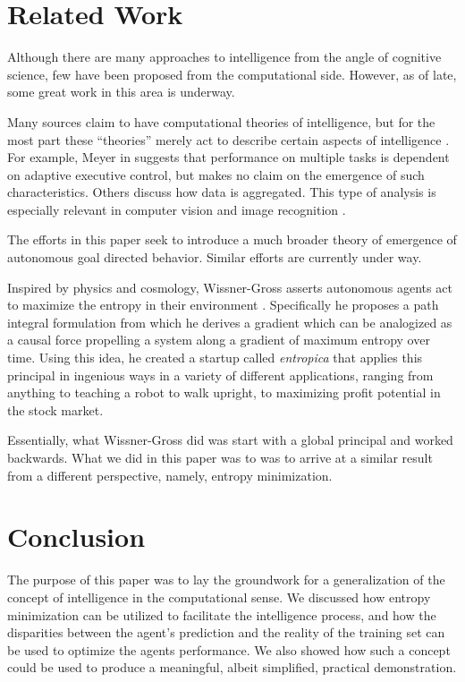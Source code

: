 \documentclass[english]{article}
\begin{document}
\section{Related Work\label{sec:Related-Work}}

Although there are many approaches to intelligence from the angle
of cognitive science, few have been proposed from the computational
side. However, as of late, some great work in this area is underway.

Many sources claim to have computational theories of intelligence,
but for the most part these ``theories'' merely act to describe
certain aspects of intelligence \cite{alb}. For example, Meyer in
\cite{meyer} suggests that performance on multiple tasks is dependent
on adaptive executive control, but makes no claim on the emergence
of such characteristics. Others discuss how data is aggregated. This
type of analysis is especially relevant in computer vision and image
recognition \cite{marr}.

The efforts in this paper seek to introduce a much broader theory
of emergence of autonomous goal directed behavior. Similar efforts
are currently under way.

Inspired by physics and cosmology, Wissner-Gross asserts autonomous
agents act to maximize the entropy in their environment \cite{wis}.
Specifically he proposes a path integral formulation from which he
derives a gradient which can be analogized as a causal force propelling
a system along a gradient of maximum entropy over time. Using this
idea, he created a startup called \emph{entropica} that applies this
principal in ingenious ways in a variety of different applications,
ranging from anything to teaching a robot to walk upright, to maximizing
profit potential in the stock market.

Essentially, what Wissner-Gross did was start with a global principal
and worked backwards. What we did in this paper was to was to arrive
at a similar result from a different perspective, namely, entropy
minimization.


\section{Conclusion\label{sec:Conclusion}}

The purpose of this paper was to lay the groundwork for a generalization
of the concept of intelligence in the computational sense. We discussed
how entropy minimization can be utilized to facilitate the intelligence
process, and how the disparities between the agent's prediction and
the reality of the training set can be used to optimize the agents
performance. We also showed how such a concept could be used to produce
a meaningful, albeit simplified, practical demonstration.
\end{document}

